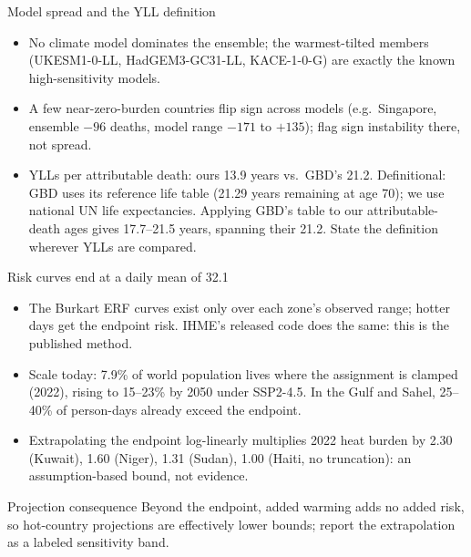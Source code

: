 \documentclass[aspectratio=169,11pt]{beamer}
\begin{document}
\begin{frame}{Model spread and the YLL definition}
  \begin{itemize}
    \item No climate model dominates the ensemble; the warmest-tilted
      members (UKESM1-0-LL, HadGEM3-GC31-LL, KACE-1-0-G) are exactly the
      known high-sensitivity models.
    \item A few near-zero-burden countries flip sign across models (e.g.\
      Singapore, ensemble \(-96\) deaths, model range \(-171\) to
      \(+135\)); flag sign instability there, not spread.
    \item YLLs per attributable death: ours 13.9 years vs.\ GBD's 21.2.
      Definitional: GBD uses its reference life table (21.29 years remaining
      at age 70); we use national UN life expectancies. Applying GBD's table
      to our attributable-death ages gives 17.7--21.5 years, spanning their
      21.2. State the definition wherever YLLs are compared.
  \end{itemize}
\end{frame}


\begin{frame}{Risk curves end at a daily mean of 32.1\,\textcelsius}
  \begin{itemize}
    \item The Burkart ERF curves exist only over each zone's observed range;
      hotter days get the endpoint risk. IHME's released code does the same:
      this is the published method.
    \item Scale today: 7.9\% of world population lives where the assignment
      is clamped (2022), rising to 15--23\% by 2050 under SSP2-4.5. In the
      Gulf and Sahel, 25--40\% of person-days already exceed the endpoint.
    \item Extrapolating the endpoint log-linearly multiplies 2022 heat
      burden by 2.30 (Kuwait), 1.60 (Niger), 1.31 (Sudan), 1.00 (Haiti,
      no truncation): an assumption-based bound, not evidence.
  \end{itemize}
  \begin{alertblock}{Projection consequence}
    Beyond the endpoint, added warming adds no added risk, so hot-country
    projections are effectively lower bounds; report the extrapolation as a
    labeled sensitivity band.
  \end{alertblock}
\end{frame}
\end{document}
